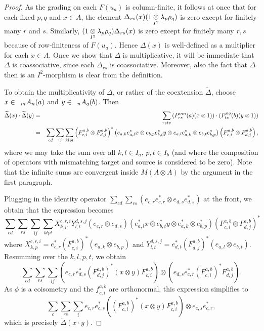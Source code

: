 \begin{proof} As the grading on each $F(u_a)$ is column-finite, it follows at once that for each fixed $p,q$ and $x\in A$, the element $\Delta_{rs}(x)(1\itimes \lambda_p\rho_q)$ is zero except for finitely many $r$ and $s$. Similarly, $(1\itimes \lambda_p\rho_q)\Delta_{rs}(x)$ is zero except for finitely many $r,s$ because of row-finiteness of $F(u_a)$. Hence $\Delta(x)$ is well-defined as a multiplier for each $x\in A$. Once we show that $\Delta$ is multiplicative, it will be immediate that $\Delta$ is coassociative, since each $\Delta_{rs}$ is coassociative. Moreover, also the fact that $\Delta$ then is an $I^2$-morphism is clear from the definition.

To obtain the multiplicativity of $\Delta$, or rather of the coextension $\widetilde{\Delta}$, choose $x\in \Grd{A}{m}{n}(a)$ and $y\in \Grd{A}{n}{q}(b)$. Then \begin{eqnarray*}\wDelta(x)\cdot\wDelta(y) &=& \sum_{rstv}\left(P^{mn}_{rs}(a)(x\otimes 1)\right)\cdot \left(P^{nq}_{tv}(b)(y\otimes 1)\right)\\ &=& \sum_{cd}\sum_{ij}\sum_{klpt} \left(F_{c,i}^{a,b}\otimes F_{d,j}^{a,b}\right)^*\left(e_{a,k}e_{a,l}^*x\otimes e_{b,p}e_{b,t}^*y\otimes e_{a,l}e_{a,k}^*\otimes e_{b,t}e_{b,p}^*\right)\left(F_{c,i}^{a,b}\otimes F_{d,j}^{a,b}\right),\end{eqnarray*} where we may take the sum over all $k,l\in I_a$, $p,t\in I_b$ (and where the composition of operators with mismatching target and source is considered to be zero). Note that the infinite sums are convergent inside $M(A\otimes A)$ by the argument in the first paragraph.

Plugging in the identity operator $\sum_{cd}\sum_{rs} \left(e_{c,r}e_{c,r}^*\otimes e_{d,s}e_{d,s}^*\right)$ at the front, we obtain that the expression becomes \[ \sum_{cd}\sum_{rs}\sum_{ij}\sum_{klpt} X^{c,r,i}_{k,p}Y^{d,s,j}_{l,t}(e_{c,r}\otimes e_{d,s})\left(e_{a,l}^*x\otimes e_{b,t}^*y\otimes e_{a,k}^*\otimes e_{b,p}^*\right)\left(F_{c,i}^{a,b}\otimes F_{d,j}^{a,b}\right)^*\] where $X^{c,r,i}_{k,p} = e_{c,r}^*(F_{c,i}^{a,b})^*(e_{a,k}\otimes e_{b,p})$ and $Y^{d,s,j}_{l,t} = e_{d,t}^*(F_{d,j}^{a,b})^*(e_{a,l}\otimes e_{b,t})$. Resumming over the $k,l,p,t$, we obtain \[\sum_{cd}\sum_{rs}\sum_{ij} \left(e_{c,r}e_{d,s}^* (F_{d,j}^{a,b})^*(x\otimes y)F_{c,i}^{a,b}\right)\otimes \left(e_{d,s}e_{c,r}^* (F_{c,i}^{a,b})^*F_{d,j}^{a,b}\right).\] As $\phi$ is a coisometry and the $f_{c,i}^{a,b}$ are orthonormal, this expression simplifies to \[\sum_{c}\sum_{rs}\sum_{i}e_{c,r}e_{c,s}^* \left((F_{c,i}^{a,b})^*(x\otimes y)F_{c,i}^{a,b}\right)\otimes e_{c,s}e_{c,r}^*,\] which is precisely $\widetilde{\Delta}(x\cdot y)$.
\end{proof}

